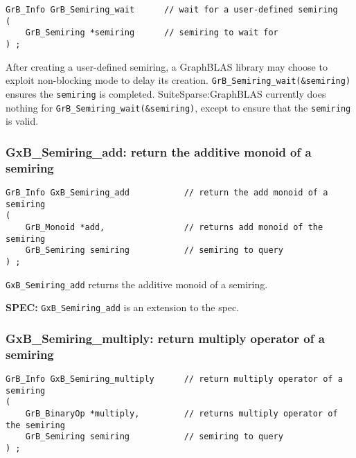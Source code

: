 \documentclass[12pt]{article}
\begin{document}
\begin{mdframed}[userdefinedwidth=6in]
{\footnotesize
\begin{verbatim}
GrB_Info GrB_Semiring_wait      // wait for a user-defined semiring
(
    GrB_Semiring *semiring      // semiring to wait for
) ;
\end{verbatim}
}\end{mdframed}

After creating a user-defined semiring, a GraphBLAS library may choose to
exploit non-blocking mode to delay its creation.
\verb'GrB_Semiring_wait(&semiring)' ensures the \verb'semiring' is completed.
SuiteSparse:GraphBLAS currently does nothing for
\verb'GrB_Semiring_wait(&semiring)', except to ensure that the \verb'semiring'
is valid.

\subsubsection{{\sf GxB\_Semiring\_add:} return the additive monoid of a semiring}
\label{semiring_add}

\begin{mdframed}[userdefinedwidth=6in]
{\footnotesize
\begin{verbatim}
GrB_Info GxB_Semiring_add           // return the add monoid of a semiring
(
    GrB_Monoid *add,                // returns add monoid of the semiring
    GrB_Semiring semiring           // semiring to query
) ;
\end{verbatim}
} \end{mdframed}

\verb'GxB_Semiring_add' returns the additive monoid of a semiring.

\begin{spec}
{\bf SPEC:} \verb'GxB_Semiring_add' is an extension to the spec.
\end{spec}

\newpage
\subsubsection{{\sf GxB\_Semiring\_multiply:} return multiply operator of a semiring}
\label{semiring_multiply}

\begin{mdframed}[userdefinedwidth=6in]
{\footnotesize
\begin{verbatim}
GrB_Info GxB_Semiring_multiply      // return multiply operator of a semiring
(
    GrB_BinaryOp *multiply,         // returns multiply operator of the semiring
    GrB_Semiring semiring           // semiring to query
) ;
\end{verbatim}
} \end{mdframed}
\end{document}
